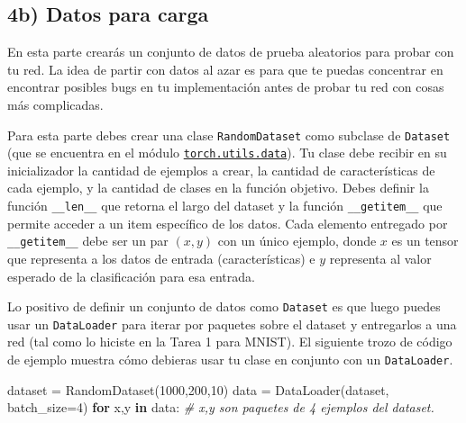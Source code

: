 \documentclass[11pt]{article}
\newenvironment{Shaded}{}{}
\newcommand{\KeywordTok}[1]{\textcolor[rgb]{0.00,0.44,0.13}{\textbf{{#1}}}}
\newcommand{\DecValTok}[1]{\textcolor[rgb]{0.25,0.63,0.44}{{#1}}}
\newcommand{\CommentTok}[1]{\textcolor[rgb]{0.38,0.63,0.69}{\textit{{#1}}}}
\newcommand{\NormalTok}[1]{{#1}}
\newcommand{\ControlFlowTok}[1]{\textcolor[rgb]{0.00,0.44,0.13}{\textbf{{#1}}}}
\newcommand{\OperatorTok}[1]{\textcolor[rgb]{0.40,0.40,0.40}{{#1}}}
\begin{document}
    \hypertarget{b-datos-para-carga}{%
\subsection{4b) Datos para carga}\label{b-datos-para-carga}}

En esta parte crearás un conjunto de datos de prueba aleatorios para
probar con tu red. La idea de partir con datos al azar es para que te
puedas concentrar en encontrar posibles bugs en tu implementación antes
de probar tu red con cosas más complicadas.

Para esta parte debes crear una clase \texttt{RandomDataset} como
subclase de \texttt{Dataset} (que se encuentra en el módulo
\href{}{\texttt{torch.utils.data}}). Tu clase debe recibir en su
inicializador la cantidad de ejemplos a crear, la cantidad de
características de cada ejemplo, y la cantidad de clases en la función
objetivo. Debes definir la función \texttt{\_\_len\_\_} que retorna el
largo del dataset y la función \texttt{\_\_getitem\_\_} que permite
acceder a un item específico de los datos. Cada elemento entregado por
\texttt{\_\_getitem\_\_} debe ser un par \((x,y)\) con un único ejemplo,
donde \(x\) es un tensor que representa a los datos de entrada
(características) e \(y\) representa al valor esperado de la
clasificación para esa entrada.

Lo positivo de definir un conjunto de datos como \texttt{Dataset} es que
luego puedes usar un \texttt{DataLoader} para iterar por paquetes sobre
el dataset y entregarlos a una red (tal como lo hiciste en la Tarea 1
para MNIST). El siguiente trozo de código de ejemplo muestra cómo
debieras usar tu clase en conjunto con un \texttt{DataLoader}.

\begin{Shaded}
\begin{Highlighting}[]
\NormalTok{dataset }\OperatorTok{=}\NormalTok{ RandomDataset(}\DecValTok{1000}\NormalTok{,}\DecValTok{200}\NormalTok{,}\DecValTok{10}\NormalTok{)}
\NormalTok{data }\OperatorTok{=}\NormalTok{ DataLoader(dataset, batch_size}\OperatorTok{=}\DecValTok{4}\NormalTok{)}
\ControlFlowTok{for}\NormalTok{ x,y }\KeywordTok{in}\NormalTok{ data:}
  \CommentTok{# x,y son paquetes de 4 ejemplos del dataset.}
\end{Highlighting}
\end{Shaded}
\end{document}
